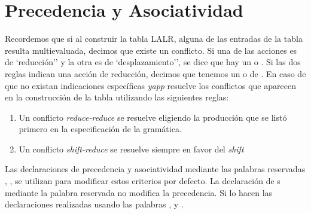 \section{Precedencia y Asociatividad}
\label{section:prioridades}
Recordemos que si al construir la tabla LALR,
alguna de las entradas de la tabla resulta multievaluada, decimos
que existe un conflicto.
Si una de las acciones es de `reducción'' y la otra es de
`desplazamiento'', se dice que hay un  o
. Si las
dos reglas indican una acción de reducción, decimos que tenemos un 
 o de .
En caso de que no existan indicaciones específicas \emph{yapp} resuelve
los conflictos que aparecen en la construcción de la tabla utilizando
las siguientes reglas:

\begin{enumerate}
\item
Un conflicto \emph{reduce-reduce} se resuelve eligiendo la producción
que se listó primero en la especificación de la gramática.
\item
Un conflicto \emph{shift-reduce} se resuelve siempre en favor del \emph{shift}
\end{enumerate}

Las declaraciones de precedencia y asociatividad mediante las
palabras reservadas , , 
se utilizan para modificar estos criterios por defecto. 
La declaración de s mediante la palabra
reservada  no modifica la precedencia. Si lo hacen las
declaraciones realizadas usando las palabras , 
y . 

